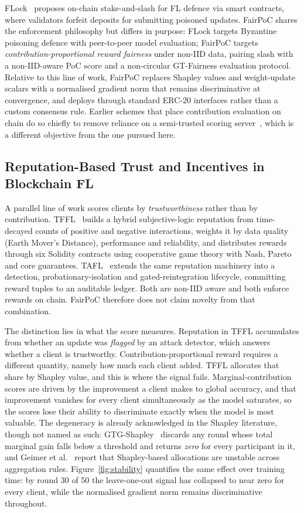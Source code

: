 \documentclass[conference]{IEEEtran}
\theoremstyle{remark}
\begin{document}
FLock~\cite{dong2022flock, dong2024flock} proposes on-chain
stake-and-slash for FL defence via smart contracts, where validators
forfeit deposits for submitting poisoned updates.
FairPoC shares the enforcement philosophy but differs in purpose:
FLock targets Byzantine poisoning defence with peer-to-peer model
evaluation; FairPoC targets \emph{contribution-proportional reward
fairness} under non-IID data, pairing slash with a non-IID-aware
PoC score and a non-circular GT-Fairness evaluation protocol.
Relative to this line of work, FairPoC replaces Shapley values and
weight-update scalars with a normalised gradient norm that remains
discriminative at convergence, and deploys through standard ERC-20
interfaces rather than a custom consensus rule. Earlier schemes that
place contribution evaluation on chain do so chiefly to remove reliance
on a semi-trusted scoring server~\cite{huang2024bcontrib}, which is a
different objective from the one pursued here.

\subsection{Reputation-Based Trust and Incentives in Blockchain FL}

A parallel line of work scores clients by \emph{trustworthiness} rather
than by contribution. TFFL~\cite{rashid2025tffl} builds a hybrid
subjective-logic reputation from time-decayed counts of positive and
negative interactions, weights it by data quality (Earth Mover's
Distance), performance and reliability, and distributes rewards through
six Solidity contracts using cooperative game theory with Nash, Pareto
and core guarantees. TAFL~\cite{rashid2026tafl} extends the same
reputation machinery into a detection, probationary-isolation and
gated-reintegration lifecycle, committing reward tuples to an auditable
ledger. Both are non-IID aware and both enforce rewards on chain.
FairPoC therefore does not claim novelty from that combination.

The distinction lies in what the score measures. Reputation in TFFL
accumulates from whether an update was \emph{flagged} by an attack
detector, which answers whether a client is trustworthy.
Contribution-proportional reward requires a different quantity, namely
how much each client added. TFFL allocates that share by Shapley value,
and this is where the signal fails. Marginal-contribution scores are
driven by the improvement a client makes to global accuracy, and that
improvement vanishes for every client simultaneously as the model
saturates, so the scores lose their ability to discriminate exactly when
the model is most valuable. The degeneracy is already acknowledged in the
Shapley literature, though not named as such: GTG-Shapley~\cite{gtgshapley2022}
discards any round whose total marginal gain falls below a threshold and
returns \emph{zero} for every participant in it, and Geimer et
al.~\cite{geimer2025volatility} report that Shapley-based allocations are
unstable across aggregation rules. Figure~\ref{fig:stability} quantifies
the same effect over training time: by round 30 of 50 the leave-one-out
signal has collapsed to near zero for every client, while the normalised
gradient norm remains discriminative throughout.
\end{document}
